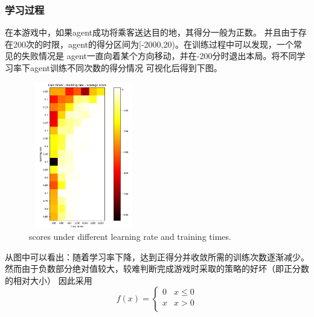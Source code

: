 \documentclass{article}
\begin{document}
\begin{CJK}{UTF8}{gbsn}
\subsubsection{学习过程}
在本游戏中，如果agent成功将乘客送达目的地，其得分一般为正数。
并且由于存在200次的时限，agent的得分区间为[-2000,20)。在训练过程中可以发现，一个常见的失败情况是
agent一直向着某个方向移动，并在-200分时退出本局。将不同学习率下agent训练不同次数的得分情况
可视化后得到下图。 
\begin{figure}[htbp]
  \centering
  \includegraphics[width=4.8cm,height=6.4cm]{images/small_map_origin.png}
  \caption{scores under different learning rate and training times.}
\end{figure} 

从图中可以看出：随着学习率下降，达到正得分并收敛所需的训练次数逐渐减少。
然而由于负数部分绝对值较大，较难判断完成游戏时采取的策略的好坏（即正分数的相对大小）
因此采用
$$
f(x) = \left\{
\begin{matrix}
0 & x\leq 0 \\
x & x>0\\ 
\end{matrix}
\right.
$$ 


\end{CJK}
\end{document}
